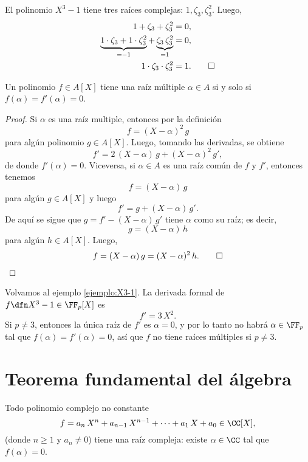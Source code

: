 \begin{ejemplo}
  El polinomio $X^3 - 1$ tiene tres raíces complejas: $1, \zeta_3,
  \zeta_3^2$. Luego,
  \begin{align*}
    1 + \zeta_3 + \zeta_3^2 & = 0,\\
    \underbrace{1\cdot\zeta_3 + 1\cdot\zeta_3^2}_{= -1} + \underbrace{\zeta_3\,\zeta_3^2}_{=1} & = 0,\\
    1\cdot \zeta_3\cdot \zeta_3^2 & = 1. \qedhere
  \end{align*}
\end{ejemplo}

\begin{proposicion}
  Un polinomio $f \in A [X]$ tiene una raíz múltiple $\alpha \in A$ si y solo si
  $f (\alpha) = f' (\alpha) = 0$.

  \begin{proof}
    Si $\alpha$ es una raíz multiple, entonces por la definición
    $$f = (X-\alpha)^2\,g$$
    para algún polinomio $g\in A [X]$. Luego, tomando las derivadas, se obtiene
    $$f' = 2\,(X-\alpha)\,g + (X-\alpha)^2\,g',$$
    de donde $f' (\alpha) = 0$. Viceversa, si $\alpha \in A$ es una raíz común
    de $f$ y $f'$, entonces tenemos
    $$f = (X-\alpha)\,g$$
    para algún $g \in A [X]$ y luego
    $$f' = g + (X-\alpha)\,g'.$$
    De aquí se sigue que $g = f' - (X-\alpha)\,g'$ tiene $\alpha$ como su raíz;
    es decir,
    $$g = (X-\alpha)\,h$$
    para algún $h \in A [X]$. Luego,
    \[ f = (X-\alpha)\,g = (X-\alpha)^2\,h. \qedhere \]
  \end{proof}
\end{proposicion}

\begin{ejemplo}
  Volvamos al ejemplo \ref{ejemplo:X3-1}. La derivada formal de
  $f \dfn X^3 - 1 \in \FF_p [X]$ es
  $$f' = 3\,X^2.$$
  Si $p \ne 3$, entonces la única raíz de $f'$ es $\alpha = 0$, y por lo tanto
  no habrá $\alpha \in \FF_p$ tal que $f (\alpha) = f' (\alpha) = 0$, así que
  $f$ no tiene raíces múltiples si $p\ne 3$.
\end{ejemplo}


\section{Teorema fundamental del álgebra}

\begin{teorema}
  Todo polinomio complejo no constante
  $$f = a_n\,X^n + a_{n-1}\,X^{n-1} + \cdots + a_1\,X + a_0 \in \CC [X],$$
  (donde $n\ge 1$ y $a_n \ne 0$) tiene una raíz compleja: existe $\alpha\in \CC$
  tal que $f (\alpha) = 0$.
\end{teorema}

